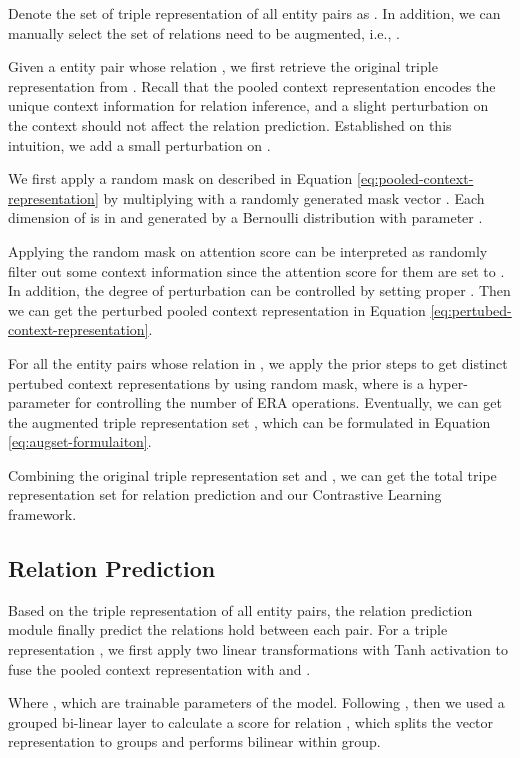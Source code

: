 \documentclass[11pt]{article}
\begin{document}
    Denote the set of triple representation of all entity pairs as . In addition, we can manually select the set of relations need to be augmented, i.e., . 
    
    Given a entity pair  whose relation , we first retrieve the original triple representation  from . Recall that the pooled context representation  encodes the unique context information for relation inference, and a slight perturbation on the context should not affect the relation prediction. Established on this intuition, we add a small perturbation on .
    
    We first apply a random mask on  described in Equation \ref{eq:pooled-context-representation} by multiplying  with a randomly generated mask vector . Each dimension of  is in  and generated by a Bernoulli distribution with parameter .
    
    Applying the random mask on attention score  can be interpreted as randomly filter out some context information since the attention score for them are set to . In addition, the degree of perturbation can be controlled by setting proper .
    Then we can get the perturbed pooled context representation  in Equation \ref{eq:pertubed-context-representation}.
    
    
    For all the entity pairs  whose relation  in , we apply the prior steps to get  distinct pertubed context representations  by using  random mask, where  is a hyper-parameter for controlling the number of ERA operations. Eventually, we can get the augmented triple representation set , which can be formulated in Equation \ref{eq:augset-formulaiton}.
    
    
    Combining the original triple representation set  and , we can get the total tripe representation set  for relation prediction and our Contrastive Learning framework.
    
    
\subsection{Relation Prediction}
    Based on the triple representation of all entity pairs, the relation prediction module finally predict the relations hold between each pair. For a triple representation , we first apply two linear transformations with Tanh activation to fuse the pooled context representation  with  and .
    
    
    Where , which are trainable parameters of the model. Following \citet{zhou_atlop_2021}, then we used a grouped bi-linear layer to calculate a score for relation , which splits the vector representation to  groups and performs bilinear within group.
    
\end{document}
